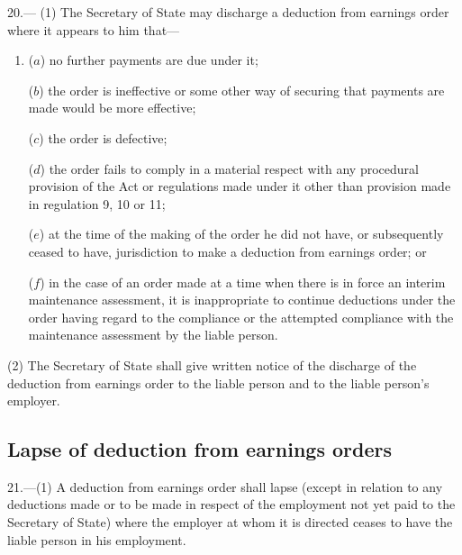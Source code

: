 \documentclass[12pt,a4paper]{article}
\begin{document}
20.—%
%
%
(1) The Secretary of State may discharge a deduction from earnings order where it appears to him that—
\begin{enumerate}\item[]
($a$) no further payments are due under it;

($b$) the order is ineffective or some other way of securing that payments are made would be more effective;

($c$) the order is defective;

($d$) the order fails to comply in a material respect with any procedural provision of the Act or regulations made under it other than provision made in regulation 9, 10 or 11;

($e$) at the time of the making of the order he did not have, or subsequently ceased to have, jurisdiction to make a deduction from earnings order; or

($f$) in the case of an order made at a time when there is in force an interim maintenance assessment, it is inappropriate to continue deductions under the order having regard to the compliance or the attempted compliance with the maintenance assessment by the liable person.
\end{enumerate}


(2) The Secretary of State shall give written notice of the discharge of the deduction from earnings order to the liable person and to the liable person’s employer.


\subsection[21. Lapse of deduction from earnings orders]{Lapse of deduction from earnings orders}

21.—(1) A deduction from earnings order shall lapse (except in relation to any deductions made or to be made in respect of the employment not yet paid to the Secretary of State) where the employer at whom it is directed ceases to have the liable person in his employment.
\end{document}
